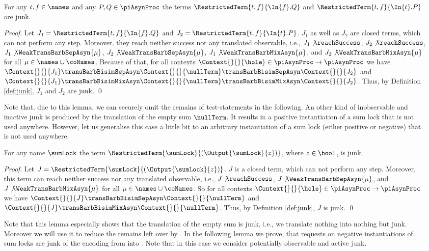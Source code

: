 \documentclass[]{llncs}
\begin{document}
\begin{lemma} \label{lem:junkTestStatement}
	For any $ t, f \in \names $ and any $ P, Q \in \piAsynProc $ the terms $ \RestrictedTerm{t, f}{\In{f}.Q} $ and $ \RestrictedTerm{t, f}{\In{t}.P} $ are junk.
\end{lemma}

\begin{proof}
	Let $ J_1 = \RestrictedTerm{t, f}{\In{f}.Q} $ and $ J_2 = \RestrictedTerm{t, f}{\In{t}.P} $. $ J_1 $ as well as $ J_2 $ are closed terms, which can not perform any step. Moreover, they reach neither success nor any translated observable, i.e., $ J_1\not\reachSuccess $, $ J_2\not\reachSuccess $, $ J_1\not\WeakTransBarbSepAsyn{\mu} $, $ J_2\not\WeakTransBarbSepAsyn{\mu} $, $ J_1\not\WeakTransBarbMixAsyn{\mu} $, and $ J_2\not\WeakTransBarbMixAsyn{\mu} $ for all $ \mu \in \names \cup \coNames $. Because of that, for all contexts $ \Context{}{}{\hole} \in \piAsynProc \to \piAsynProc $ we have $ \Context{}{}{J_1} \transBarbBisimSepAsyn \Context{}{}{\nullTerm} \transBarbBisimSepAsyn \Context{}{}{J_2} $ and $ \Context{}{}{J_1} \transBarbBisimMixAsyn \Context{}{}{\nullTerm} \transBarbBisimMixAsyn \Context{}{}{J_2} $. Thus, by Definition \ref{def:junk}, $ J_1 $ and $ J_2 $ are junk.
	\qed
\end{proof}

Note that, due to this lemma, we can securely omit the remains of test-statements in the following. An other kind of inobservable and inactive junk is produced by the translation of the empty sum $ \nullTerm $. It results in a positive instantiation of a sum lock that is not used anywhere. However, let us generalise this case a little bit to an arbitrary instantiation of a sum lock (either positive or negative) that is not used anywhere.

\begin{lemma} \label{lem:junkEmptySum}
	For any name $ \sumLock $ the term $ \RestrictedTerm{\sumLock}{\left( \Output{\sumLock}{z} \right)} $, where $ z \in \bool $, is junk.
\end{lemma}

\begin{proof}
	Let $ J =  \RestrictedTerm{\sumLock}{\left( \Output{\sumLock}{z} \right)} $. $ J $ is a closed term, which can not perform any step. Moreover, this term can reach neither success nor any translated observable, i.e., $ J\not\reachSuccess $, $ J\not\WeakTransBarbSepAsyn{\mu} $, and $ J\not\WeakTransBarbMixAsyn{\mu} $ for all $ \mu \in \names \cup \coNames $. So for all contexts $ \Context{}{}{\hole} \in \piAsynProc \to \piAsynProc $ we have $ \Context{}{}{J} \transBarbBisimSepAsyn \Context{}{}{\nullTerm} $ and $ \Context{}{}{J} \transBarbBisimMixAsyn \Context{}{}{\nullTerm} $. Thus, by Definition \ref{def:junk}, $ J $ is junk.
	\qed
\end{proof}
\noindent
Note that this lemma especially shows that the translation of the empty sum is junk, i.e., we translate nothing into nothing but junk. Moreover we will use it to reduce the remains left over by \simulations. In the following lemma we prove, that requests on negative instantiations of sum locks are junk of the encoding from \piMix into \piAsyn. Note that in this case we consider potentially observable and active junk.
\end{document}
